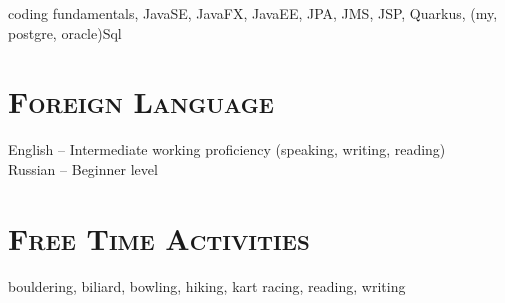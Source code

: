 \documentclass{article}
\begin{document}
coding fundamentals, JavaSE, JavaFX, JavaEE, JPA, JMS, JSP,  Quarkus, (my, postgre, oracle)Sql

\section{\textsc{Foreign Language}}

English  -- Intermediate working proficiency (speaking, writing, reading)\\
Russian -- Beginner level

\section{\textsc{Free Time Activities}}

bouldering, biliard, bowling, hiking, kart racing, reading, writing
\end{document}
